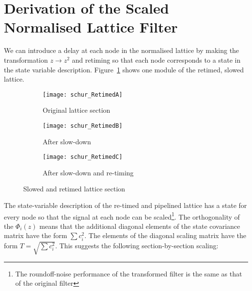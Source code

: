 \documentclass[a4paper,twoside,10pt,english]{report}
\begin{document}
\section{Derivation of the Scaled Normalised Lattice Filter}
We can introduce a delay at each node in the normalised lattice by
making the transformation $z\rightarrow z^{2}$ and retiming so that
each node corresponds to a state in the state variable description.
Figure~\ref{fig:Slowed-and-retimed} shows one module of the retimed,
slowed lattice. 
\begin{figure}[!htbp]
\begin{center}
\begin{subfigure}{0.2\textwidth}
\begin{center}
\texttt{[image: schur\_RetimedA]}
\caption{Original lattice section}
\end{center}
\end{subfigure}
 
\begin{subfigure}{0.2\textwidth}
\begin{center}
\texttt{[image: schur\_RetimedB]}
\caption{After slow-down}
\end{center}
\end{subfigure}
 
\begin{subfigure}{0.2\textwidth}
\begin{center}
\texttt{[image: schur\_RetimedC]}
\caption{After slow-down and re-timing}
\end{center}
\end{subfigure}
\caption{Slowed and retimed lattice section}
\label{fig:Slowed-and-retimed}
\end{center}
\end{figure}
The state-variable description of the re-timed and pipelined lattice
has a state for every node so that the signal at each node can be
scaled\footnote{The roundoff-noise performance of the transformed filter is the
same as that of the original filter}. The orthogonality of the 
$\Phi_{i}\left(z\right)$ means that the additional diagonal elements of the 
state covariance matrix have the form $\sum c_{i}^{2}$. The elements of 
the diagonal scaling matrix have the form $T=\sqrt{\sum c_{i}^{2}}$. This 
suggests the following section-by-section scaling:
\end{document}

